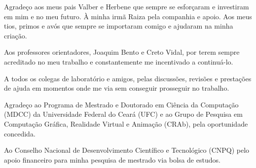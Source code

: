 
Agradeço aos meus pais Valber e Herbene que sempre se esforçaram e investiram em mim e no meu futuro. À minha irmã Raiza pela companhia e apoio. Aos meus tios, primos e avós que sempre se importaram comigo e ajudaram na minha criação.

Aos professores orientadores, Joaquim Bento e Creto Vidal, por terem sempre acreditado no meu trabalho e constantemente me incentivado a continuá-lo.

A todos os colegas de laboratório e amigos, pelas discussões, revisões e prestações de ajuda em momentos onde me via sem conseguir prosseguir no trabalho.

Agradeço ao Programa de Mestrado e Doutorado em Ciência da Computação (MDCC) da Universidade Federal do Ceará (UFC) e ao Grupo de Pesquisa em Computação Gráfica, Realidade Virtual e Animação (CRAb), pela oportunidade concedida.

Ao Conselho Nacional de Desenvolvimento Científico e Tecnológico (CNPQ) pelo apoio financeiro para minha pesquisa de mestrado via bolsa de estudos.


